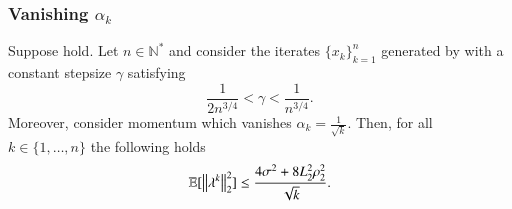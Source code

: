 \begin{toappendix}

\subsubsection{Vanishing $\alpha_k$}\label{subsec:uSCGvanishing}

\begin{lemma}
\label{lem:uSCGerrorbound}
    Suppose  hold. Let $n\in\mathbb{N}^*$ and consider the iterates $\{x_{k}\}_{k=1}^n$ generated by 
    with a constant stepsize $\gamma$ satisfying
    \begin{equation}
        \frac{1}{2 n^{3/4}}<\gamma <\frac{1}{n^{3/4}}.
    \end{equation}
    Moreover, consider momentum which vanishes $\alpha_{k}= \frac{1}{\sqrt{k}}$. Then, for all $k\in\{1,\ldots,n\}$ the following holds
     \begin{equation}
            \mathbb{E}[\left\Vert{\lambda^{k}}\right\Vert_{2}^{2}]\leq \frac{4\sigma^2+8L_2^2\rho_2^2}{\sqrt{k}}.
    \end{equation}
\end{lemma}


\end{toappendix}
